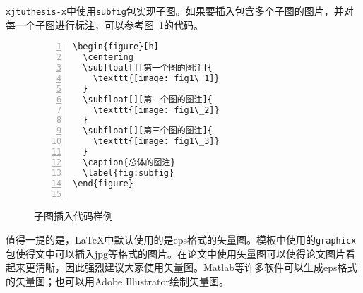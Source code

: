 \texttt{xjtuthesis-x}中使用\texttt{subfig}包实现子图。如果要插入包含多个子图的图片，并对每一个子图进行标注，可以参考图~\ref{fig:fig_demo_subfig}的代码。

\begin{figure}[h]
  {
  \fontsize{10pt}{12pt}\selectfont
  \setmainfont{Courier New}
  \begin{lstlisting}[showstringspaces=false,numbers=left,xleftmargin=3em]
\begin{figure}[h]
  \centering
  \subfloat[][第一个图的图注]{
    \texttt{[image: fig1\_1]}
  }
  \subfloat[][第二个图的图注]{
    \texttt{[image: fig1\_2]}
  }
  \subfloat[][第三个图的图注]{
    \texttt{[image: fig1\_3]}
  }
  \caption{总体的图注}
  \label{fig:subfig}
\end{figure}


  \end{lstlisting}
  }
\caption{子图插入代码样例}
\label{fig:fig_demo_subfig}
\end{figure}

值得一提的是，\LaTeX 中默认使用的是eps格式的矢量图。模板中使用的\texttt{graphicx}包使得文中可以插入jpg等格式的图片。在论文中使用矢量图可以使得论文图片看起来更清晰，因此强烈建议大家使用矢量图。Matlab等许多软件可以生成eps格式的矢量图；也可以用Adobe Illustrator绘制矢量图。
